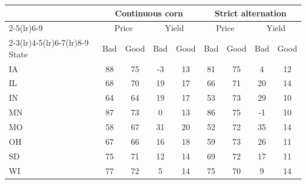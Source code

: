 \begin{tabular}{lcccccccc}
\toprule
& \multicolumn{4}{c}{Continuous corn} & \multicolumn{4}{c}{Strict alternation}\\
\cmidrule(lr){2-5}\cmidrule(lr){6-9}
& \multicolumn{2}{c}{Price} & \multicolumn{2}{c}{Yield} & \multicolumn{2}{c}{Price} & \multicolumn{2}{c}{Yield}\\
\cmidrule(lr){2-3}\cmidrule(lr){4-5}\cmidrule(lr){6-7}\cmidrule(lr){8-9}
State & Bad & Good & Bad & Good & Bad & Good & Bad & Good\\
\midrule
IA & 88 & 75 & -3 & 13 & 81 & 75 & 4 & 12 \\
IL & 68 & 70 & 19 & 17 & 66 & 71 & 20 & 14 \\
IN & 64 & 64 & 19 & 17 & 53 & 73 & 29 & 10 \\
MN & 87 & 73 & 0 & 13 & 86 & 75 & -1 & 10 \\
MO & 58 & 67 & 31 & 20 & 52 & 72 & 35 & 14 \\
OH & 67 & 66 & 16 & 18 & 59 & 73 & 26 & 11 \\
SD & 75 & 71 & 12 & 14 & 69 & 72 & 17 & 11 \\
WI & 77 & 72 & 5 & 14 & 75 & 70 & 9 & 14 \\
\bottomrule
\end{tabular}
